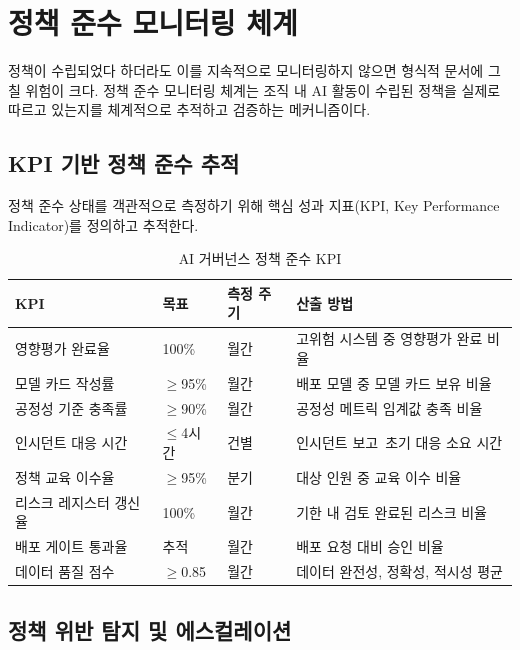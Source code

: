 \section{정책 준수 모니터링 체계}
\label{sec:5.4}

정책이 수립되었다 하더라도 이를 지속적으로 모니터링하지 않으면 형식적 문서에 그칠 위험이 크다. 정책 준수 모니터링 체계는 조직 내 AI 활동이 수립된 정책을 실제로 따르고 있는지를 체계적으로 추적하고 검증하는 메커니즘이다.

\subsection{KPI 기반 정책 준수 추적}
\label{sec:5.4.1}

정책 준수 상태를 객관적으로 측정하기 위해 핵심 성과 지표(KPI, Key Performance Indicator)를 정의하고 추적한다.

\begin{table}[htbp]
\centering
\caption{AI 거버넌스 정책 준수 KPI}
\label{tab:compliance_kpi}
\begin{tabularx}{\textwidth}{p{3.5cm}p{2cm}p{2cm}X}
\toprule
\textbf{KPI} & \textbf{목표} & \textbf{측정 주기} & \textbf{산출 방법} \\
\midrule
영향평가 완료율 & 100\% & 월간 & 고위험 시스템 중 영향평가 완료 비율 \\
모델 카드 작성률 & $\geq$95\% & 월간 & 배포 모델 중 모델 카드 보유 비율 \\
공정성 기준 충족률 & $\geq$90\% & 월간 & 공정성 메트릭 임계값 충족 비율 \\
인시던트 대응 시간 & $\leq$4시간 & 건별 & 인시던트 보고~초기 대응 소요 시간 \\
정책 교육 이수율 & $\geq$95\% & 분기 & 대상 인원 중 교육 이수 비율 \\
리스크 레지스터 갱신율 & 100\% & 월간 & 기한 내 검토 완료된 리스크 비율 \\
배포 게이트 통과율 & 추적 & 월간 & 배포 요청 대비 승인 비율 \\
데이터 품질 점수 & $\geq$0.85 & 월간 & 데이터 완전성, 정확성, 적시성 평균 \\
\bottomrule
\end{tabularx}
\end{table}

\subsection{정책 위반 탐지 및 에스컬레이션}
\label{sec:5.4.2}

